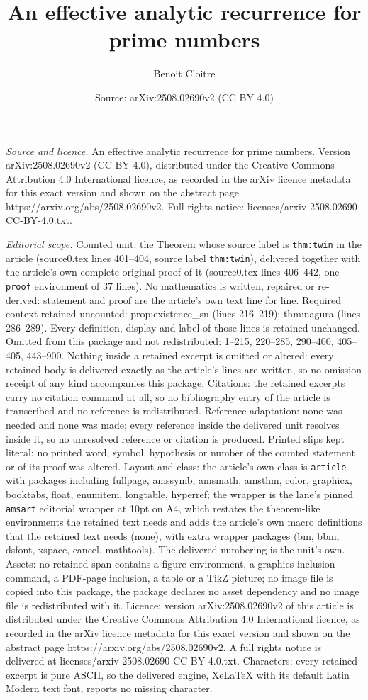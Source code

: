 \documentclass[10pt,a4paper]{amsart}
\title[An effective analytic recurrence for prime numbers]{An effective analytic recurrence for prime numbers}
\author{Benoit Cloitre}
\date{Source: arXiv:2508.02690v2 (CC BY 4.0)}
\begin{document}
\maketitle

\noindent\emph{Source and licence.} An effective analytic recurrence for prime numbers. Version arXiv:2508.02690v2 (CC BY 4.0), distributed under the Creative Commons Attribution 4.0 International licence, as recorded in the arXiv licence metadata for this exact version and shown on the abstract page https://arxiv.org/abs/2508.02690v2. Full rights notice: licenses/arxiv-2508.02690-CC-BY-4.0.txt.\par\smallskip

\noindent\textit{Editorial scope.} Counted unit: the Theorem whose source label is \texttt{thm:twin} in the article (source0.tex lines 401--404, source label \texttt{thm:twin}), delivered together with the article's own complete original proof of it (source0.tex lines 406--442, one \texttt{proof} environment of 37 lines). No mathematics is written, repaired or re-derived: statement and proof are the article's own text line for line. Required context retained uncounted: prop:existence\_sn (lines 216--219); thm:nagura (lines 286--289). Every definition, display and label of those lines is retained unchanged. Omitted from this package and not redistributed: 1--215, 220--285, 290--400, 405--405, 443--900. Nothing inside a retained excerpt is omitted or altered: every retained body is delivered exactly as the article's lines are written, so no omission receipt of any kind accompanies this package. Citations: the retained excerpts carry no citation command at all, so no bibliography entry of the article is transcribed and no reference is redistributed. Reference adaptation: none was needed and none was made; every reference inside the delivered unit resolves inside it, so no unresolved reference or citation is produced. Printed slips kept literal: no printed word, symbol, hypothesis or number of the counted statement or of its proof was altered. Layout and class: the article's own class is \texttt{article} with packages including fullpage, amssymb, amsmath, amsthm, color, graphicx, booktabs, float, enumitem, longtable, hyperref; the wrapper is the lane's pinned \texttt{amsart} editorial wrapper at 10pt on A4, which restates the theorem-like environments the retained text needs and adds the article's own macro definitions that the retained text needs (none), with extra wrapper packages (bm, bbm, dsfont, xspace, cancel, mathtools). The delivered numbering is the unit's own. Assets: no retained span contains a figure environment, a graphics-inclusion command, a PDF-page inclusion, a table or a TikZ picture; no image file is copied into this package, the package declares no asset dependency and no image file is redistributed with it. Licence: version arXiv:2508.02690v2 of this article is distributed under the Creative Commons Attribution 4.0 International licence, as recorded in the arXiv licence metadata for this exact version and shown on the abstract page https://arxiv.org/abs/2508.02690v2. A full rights notice is delivered at licenses/arxiv-2508.02690-CC-BY-4.0.txt. Characters: every retained excerpt is pure ASCII, so the delivered engine, XeLaTeX with its default Latin Modern text font, reports no missing character.
\end{document}
